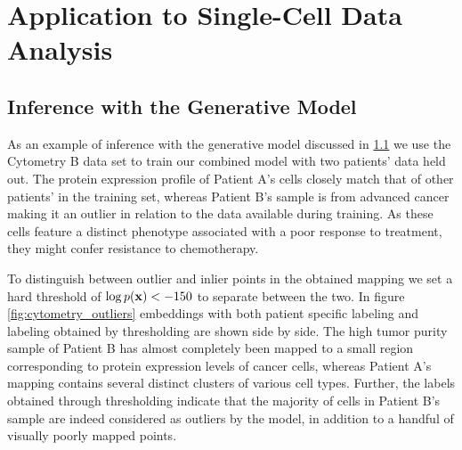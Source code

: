 \section{Application to Single-Cell Data Analysis}
\label{section:applications}

\subsection{Inference with the Generative Model}
\label{section:inference_with_the_generative_model}

As an example of inference with the generative model discussed in \ref{section:inference_with_the_generative_model} we use the Cytometry B data set to train our combined model with two patients' data held out. The protein expression profile of Patient A's cells closely match that of other patients' in the training set, whereas Patient B's sample is from advanced cancer making it an outlier in relation to the data available during training. As these cells feature a distinct phenotype associated with a poor response to treatment, they might confer resistance to chemotherapy.

To distinguish between outlier and inlier points in the obtained mapping we set a hard threshold of $\log p(\mathbf{x}) < -150$ to separate between the two. In figure \ref{fig:cytometry_outliers} embeddings with both patient specific labeling and labeling obtained by thresholding are shown side by side. The high tumor purity sample of Patient B has almost completely been mapped to a small region corresponding to protein expression levels of cancer cells, whereas Patient A's mapping contains several distinct clusters of various cell types. Further, the labels obtained through thresholding indicate that the majority of cells in Patient B's sample are indeed considered as outliers by the model, in addition to a handful of visually poorly mapped points.

